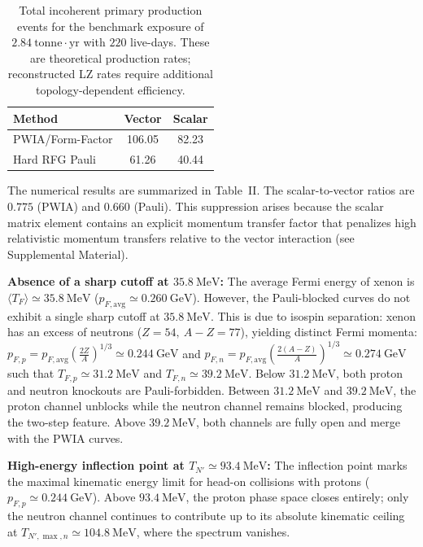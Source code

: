 \documentclass[aps,twocolumn,superscriptaddress,groupedaddress,nofootinbib,floatfix]{revtex4}
\begin{document}
\begin{table}[h]
\centering
\caption{Total incoherent primary production events for the benchmark exposure of $2.84\ \text{tonne}\cdot\text{yr}$ with $220$ live-days. These are theoretical production rates; reconstructed LZ rates require additional topology-dependent efficiency.}
\label{tab:incoh}
\begin{tabular}{lcc}
\toprule
Method & Vector & Scalar \\
\midrule
PWIA/Form-Factor & 106.05 & 82.23 \\
Hard RFG Pauli & 61.26 & 40.44 \\
\bottomrule
\end{tabular}
\end{table}

The numerical results are summarized in Table~II. The scalar-to-vector ratios are $0.775$ (PWIA) and $0.660$ (Pauli). This suppression arises because the scalar matrix element contains an explicit momentum transfer factor that penalizes high relativistic momentum transfers relative to the vector interaction (see Supplemental Material).

\textbf{Absence of a sharp cutoff at $35.8\ \text{MeV}$:} The average Fermi energy of xenon is $\langle T_F\rangle\simeq35.8\ \text{MeV}$ ($p_{F,\text{avg}}\simeq0.260\ \text{GeV}$). However, the Pauli-blocked curves do not exhibit a single sharp cutoff at $35.8\ \text{MeV}$. This is due to isospin separation: xenon has an excess of neutrons ($Z=54,\ A-Z=77$), yielding distinct Fermi momenta: $p_{F,p}=p_{F,\text{avg}}\left(\frac{2Z}{A}\right)^{1/3}\simeq0.244\ \text{GeV}$ and $p_{F,n}=p_{F,\text{avg}}\left(\frac{2(A-Z)}{A}\right)^{1/3}\simeq0.274\ \text{GeV}$ such that $T_{F,p}\simeq31.2\ \text{MeV}$ and $T_{F,n}\simeq39.2\ \text{MeV}$. Below $31.2\ \text{MeV}$, both proton and neutron knockouts are Pauli-forbidden. Between $31.2\ \text{MeV}$ and $39.2\ \text{MeV}$, the proton channel unblocks while the neutron channel remains blocked, producing the two-step feature. Above $39.2\ \text{MeV}$, both channels are fully open and merge with the PWIA curves.

\textbf{High-energy inflection point at $T_{N'}\simeq93.4\ \text{MeV}$:} The inflection point marks the maximal kinematic energy limit for head-on collisions with protons ($p_{F,p}\simeq0.244\ \text{GeV}$). Above $93.4\ \text{MeV}$, the proton phase space closes entirely; only the neutron channel continues to contribute up to its absolute kinematic ceiling at $T_{N',\max,n}\simeq104.8\ \text{MeV}$, where the spectrum vanishes.
\end{document}
